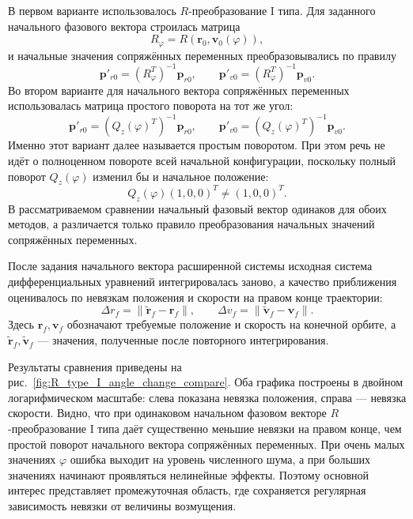 В первом варианте использовалось \(R\)-преобразование I типа. Для заданного начального фазового вектора строилась матрица
\begin{equation}
R_\varphi=R(\mathbf r_0,\mathbf v_0(\varphi)),
\end{equation}
и начальные значения сопряжённых переменных преобразовывались по правилу
\begin{equation}
\mathbf p'_{r0}=(R_\varphi^T)^{-1}\mathbf p_{r0},
\qquad
\mathbf p'_{v0}=(R_\varphi^T)^{-1}\mathbf p_{v0}.
\end{equation}
Во втором варианте для начального вектора сопряжённых переменных использовалась матрица простого поворота на тот же угол:
\begin{equation}
\mathbf p'_{r0}=(Q_z(\varphi)^T)^{-1}\mathbf p_{r0},
\qquad
\mathbf p'_{v0}=(Q_z(\varphi)^T)^{-1}\mathbf p_{v0}.
\end{equation}
Именно этот вариант далее называется простым поворотом. При этом речь не идёт о полноценном повороте всей начальной конфигурации, поскольку полный поворот \(Q_z(\varphi)\) изменил бы и начальное положение:
\begin{equation}
Q_z(\varphi)(1,0,0)^T\ne(1,0,0)^T.
\end{equation}
В рассматриваемом сравнении начальный фазовый вектор одинаков для обоих методов, а различается только правило преобразования начальных значений сопряжённых переменных.

После задания начального вектора расширенной системы исходная система дифференциальных уравнений интегрировалась заново, а качество приближения оценивалось по невязкам положения и скорости на правом конце траектории:
\begin{equation}
\Delta r_f=\|\widetilde{\mathbf r}_f-\mathbf r_f\|,
\qquad
\Delta v_f=\|\widetilde{\mathbf v}_f-\mathbf v_f\|.
\end{equation}
Здесь \(\mathbf r_f,\mathbf v_f\) обозначают требуемые положение и скорость на конечной орбите, а \(\widetilde{\mathbf r}_f,\widetilde{\mathbf v}_f\) --- значения, полученные после повторного интегрирования.

Результаты сравнения приведены на рис.~\ref{fig:R_type_I_angle_change_compare}. Оба графика построены в двойном логарифмическом масштабе: слева показана невязка положения, справа --- невязка скорости. Видно, что при одинаковом начальном фазовом векторе \(R\)-преобразование I типа даёт существенно меньшие невязки на правом конце, чем простой поворот начального вектора сопряжённых переменных. При очень малых значениях \(\varphi\) ошибка выходит на уровень численного шума, а при больших значениях начинают проявляться нелинейные эффекты. Поэтому основной интерес представляет промежуточная область, где сохраняется регулярная зависимость невязки от величины возмущения.

